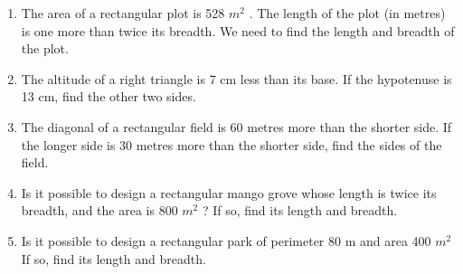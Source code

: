 \begin{enumerate}[label=\arabic*.,ref=\thesubsection.\theenumi]
\item The area of a rectangular plot is 528 $m^2$
. The length of the plot (in metres) is one more than twice its breadth. We need to find the length and breadth of the plot.
%
\item  The altitude of a right triangle is 7 cm less than its base. If the hypotenuse is 13 cm, find the other two sides.
%
\item The diagonal of a rectangular field is 60 metres more than the shorter side. If the longer side is 30 metres more than the shorter side, find the sides of the field.
\item Is it possible to design a rectangular mango grove whose length is twice its breadth, and the area is 800 $m^2$
? If so, find its length and breadth.
%
\item Is it possible to design a rectangular park of perimeter 80 m and area 400 $m^2$ If so, find  its length and breadth.

\end{enumerate}
